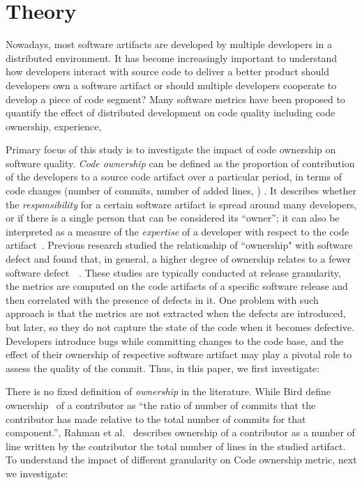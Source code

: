 
\section{Theory}
\label{sec:prob}

Nowadays, most software artifacts are developed by multiple developers in a
distributed environment. It has become increasingly important to understand how
developers interact with source code to deliver a better product\textemdash
should developers own a software artifact or should multiple developers
cooperate to develop a piece of code segment? Many software metrics have been
proposed to quantify the effect of distributed development on code quality
including code ownership, experience, \etc 

Primary focus of this study is to investigate the impact of code ownership on
software quality. {\em Code ownership} can be defined as the proportion of
contribution of the developers to a source code artifact over a particular
period, in terms of code changes (\eg number of commits, number of added lines,
\etc) \cite{Greiler:replication}. It describes whether the
\textit{responsibility} for a certain software artifact is spread around many
developers, or if there is a single person that can be considered its
``owner'';  it can also be interpreted as a measure of the \textit{expertise}
of a developer with respect to the code artifact~\cite{bird:original}.
Previous research studied the relationship of ``ownership" with software defect
and found that, in general, a higher degree of ownership relates to a fewer
software defect~\cite{bird:original}~. These studies are typically
conducted at release granularity, 
\ie the metrics are computed on the code artifacts of a specific software
release and then correlated with the presence of defects in it. 
One problem with such approach is that the metrics are not extracted when the
defects are introduced, but later, so they do not capture the state of the code
when it becomes defective. Developers introduce bugs while committing changes
to the code base, and the effect of their ownership of respective software
artifact may play a pivotal role to assess the quality of the commit.  Thus, in
this paper, we first investigate:


There is no fixed definition of {\em ownership} in the literature. While Bird
\etal define ownership~\cite{bird:original} of a contributor as ``the ratio of
number of commits that the contributor has made relative to the total
number of commits for that component.'', Rahman et al.~\cite{Rahman:blame}
describes ownership of a contributor as a number of line written by the
contributor \wrt the total number of lines in the studied artifact. To
understand the impact of different granularity on Code ownership metric, next
we investigate: 

